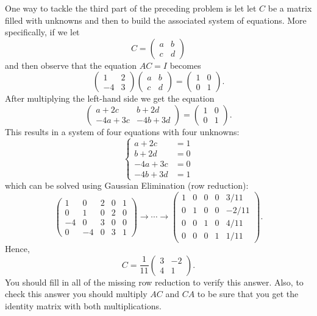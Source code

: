 One way to tackle the third part of the preceding problem is let let $C$ be a
matrix filled with unknowns and then to build the associated system of equations.  More
specifically, if we let 
\[ C = \begin{pmatrix} a & b \\ c & d \end{pmatrix} \]
and then observe that the equation $AC = I$ becomes
\[ \begin{pmatrix} 1 & 2 \\ -4 & 3 \end{pmatrix} \begin{pmatrix} a & b \\ c & d
\end{pmatrix} = \begin{pmatrix} 1 & 0 \\ 0 & 1 \end{pmatrix}. \]
After multiplying the left-hand side we get the equation
\[ \begin{pmatrix} a + 2c & b + 2d \\ -4a + 3c & -4b + 3d \end{pmatrix} = \begin{pmatrix}
    1 & 0 \\ 0 & 1 \end{pmatrix}. \]
This results in a system of four equations with four unknowns:
\[ \left\{ \begin{array}{rl} a + 2c &= 1 \\ b+2d &= 0 \\ -4a + 3c &= 0 \\ -4b + 3d &= 1
\end{array} \right. \]
which can be solved using Gaussian Elimination (row reduction):  
\[ \left( \begin{array}{cccc|c} 1 & 0 & 2 & 0 & 1 \\
        0 & 1 & 0 & 2 & 0 \\
        -4 & 0 & 3 & 0 & 0 \\
    0 & -4 & 0 & 3 & 1 \end{array} \right) \to \cdots \to 
\left( \begin{array}{cccc|c} 1 & 0 & 0 & 0 & 3/11 \\
    0 & 1 & 0 & 0 & -2/11 \\
    0 & 0 & 1 & 0 & 4/11 \\
    0 & 0 & 0 & 1 & 1/11 \end{array} \right).
    \]
Hence, 
\[ C = \frac{1}{11} \begin{pmatrix} 3 & -2 \\ 4 & 1 \end{pmatrix}. \]
You should fill in all of the missing row reduction to verify this answer.  Also, to check
this answer you should multiply $AC$ and $CA$ to be sure that you get the identity matrix
with both multiplications.

